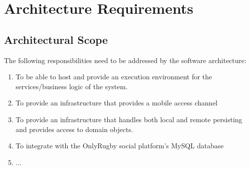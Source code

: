 \section{Architecture Requirements}
	\subsection{Architectural Scope}
	The following responsibilities need to be addressed by the software architecture:
	\begin{enumerate}
		\item To be able to host and provide an execution environment for the services/business logic of the system.
		\item To provide an infrastructure that provides a mobile access channel
		\item To provide an infrastructure that handles both local and remote persisting and provides access to domain objects.
		\item To integrate with the OnlyRugby social platform's MySQL database
		\item ...
	\end{enumerate}